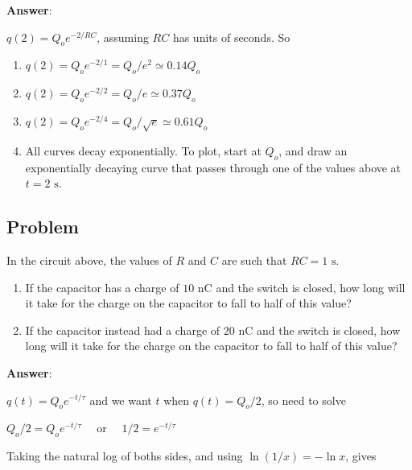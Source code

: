 \documentclass{article}
\begin{document}


\ifsolutions
\textbf{Answer}:

$q(2)=Q_oe^{-2/RC}$, assuming $RC$ has units of seconds. So

    \begin{enumerate}

      \item $q(2)=Q_oe^{-2/1}=Q_o/e^2 \simeq 0.14 Q_o$

      \item $q(2)=Q_oe^{-2/2}=Q_o/e \simeq 0.37 Q_o$

      \item $q(2)=Q_oe^{-2/4}=Q_o/\sqrt{e} \simeq 0.61 Q_o$

      \item All curves decay exponentially. To plot, start at $Q_o$, and draw an exponentially decaying curve that passes through one of the values above at $t=2\text{ s}$.

    \end{enumerate}
\fi

\subsection{Problem}



In the circuit above, the values of $R$ and $C$ are such that $RC=1\text{ s}$.

\begin{enumerate}

  \item If the capacitor has a charge of $10\text{ nC}$ and the switch is closed, how long will it take for the charge on the capacitor to fall to half of this value?

  \item If the capacitor instead had a charge of $20\text{ nC}$ and the switch is closed, how long will it take for the charge on the capacitor to fall to half of this value?

\end{enumerate}

\ifsolutions
\textbf{Answer}:

$q(t)=Q_oe^{-t/\tau}$ and we want $t$ when $q(t)=Q_o/2$, so need to solve 

$Q_o/2=Q_oe^{-t/\tau}\quad$ or $\quad 1/2=e^{-t/\tau}$

Taking the natural log of boths sides, and using $\ln(1/x)=-\ln x$, gives
\end{document}
